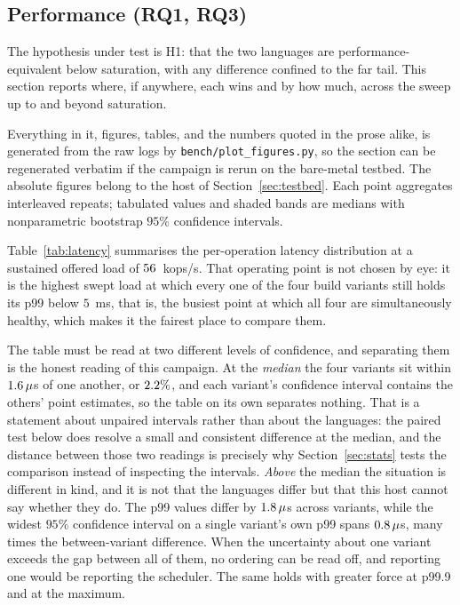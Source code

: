 \documentclass[english,twoside,openright,a4paper,censored,csm,software-track-2020]{HYthesisML}
\begin{document}
\subsection{Performance (RQ1, RQ3)}\label{sec:perfresults}
The hypothesis under test is H1: that the two languages are performance-equivalent below
saturation, with any difference confined to the far tail. This section reports where, if
anywhere, each wins and by how much, across the sweep up to and beyond saturation.

Everything in it, figures, tables, and the numbers quoted in the prose alike, is generated from
the raw logs by \texttt{bench/plot\_figures.py}, so the section can be regenerated verbatim if
the campaign is rerun on the bare-metal testbed. The absolute figures belong to the host of
Section~\ref{sec:testbed}. Each point aggregates \NRepeats{} interleaved repeats; tabulated
values and shaded bands are medians with nonparametric bootstrap $95\%$ confidence intervals.

Table~\ref{tab:latency} summarises the per-operation latency distribution at a sustained
offered load of $56$~kops/s. That operating point is not chosen by eye: it is the
highest swept load at which every one of the four build variants still holds its p99 below
$5$~ms, that is, the busiest point at which all four are simultaneously healthy, which makes
it the fairest place to compare them.

The table must be read at two different levels of confidence, and separating them is the
honest reading of this campaign. At the \emph{median} the four variants sit within
$1.6\,\mu$s of one another, or $2.2\%$, and each variant's confidence
interval contains the others' point estimates, so the table on its own separates nothing.
That is a statement about unpaired intervals rather than about the languages: the paired test
below does resolve a small and consistent difference at the median, and the distance between
those two readings is precisely why Section~\ref{sec:stats} tests the comparison instead of
inspecting the intervals. \emph{Above} the median the situation is different in kind, and it
is not that the languages differ but that this host cannot say whether they do. The p99 values differ by
$1.8\,\mu$s across variants, while the widest $95\%$ confidence interval on a
single variant's own p99 spans $0.8\,\mu$s, many times the between-variant
difference. When the uncertainty about one variant exceeds the gap between all of them, no
ordering can be read off, and reporting one would be reporting the scheduler. The same holds
with greater force at p99.9 and at the maximum.
\end{document}
